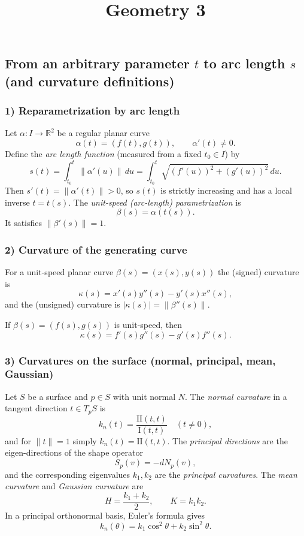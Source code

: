 \documentclass[12pt,a4paper]{article}
\title{Geometry 3}
\author{}
\date{}
\theoremstyle{plain}
\theoremstyle{definition}      %
\begin{document}
	\maketitle

\subsection*{From an arbitrary parameter $t$ to arc length $s$ (and curvature definitions)}

\subsubsection*{1) Reparametrization by arc length}
Let $\alpha:I\to\mathbb R^2$ be a regular planar curve
\[
\alpha(t)=(f(t),g(t)),\qquad \alpha'(t)\neq 0.
\]
Define the \emph{arc length function} (measured from a fixed $t_0\in I$) by
\[
s(t)=\int_{t_0}^{t}\|\alpha'(u)\|\,du
=\int_{t_0}^{t}\sqrt{(f'(u))^2+(g'(u))^2}\,du.
\]
Then $s'(t)=\|\alpha'(t)\|>0$, so $s(t)$ is strictly increasing and has a local inverse $t=t(s)$.
The \emph{unit-speed (arc-length) parametrization} is
\[
\beta(s)=\alpha(t(s)).
\]
It satisfies $\|\beta'(s)\|=1$.

\subsubsection*{2) Curvature of the generating curve}
For a unit-speed planar curve $\beta(s)=(x(s),y(s))$ the (signed) curvature is
\[
\kappa(s)=x'(s)y''(s)-y'(s)x''(s),
\]
and the (unsigned) curvature is $|\kappa(s)|=\|\beta''(s)\|$.

If $\beta(s)=(f(s),g(s))$ is unit-speed, then
\[
\kappa(s)=f'(s)g''(s)-g'(s)f''(s).
\]

\subsubsection*{3) Curvatures on the surface (normal, principal, mean, Gaussian)}
Let $S$ be a surface and $p\in S$ with unit normal $N$.
The \emph{normal curvature} in a tangent direction $t\in T_pS$ is
\[
k_n(t)=\frac{\mathrm{II}(t,t)}{\mathrm{I}(t,t)}\quad (t\neq 0),
\]
and for $\|t\|=1$ simply $k_n(t)=\mathrm{II}(t,t)$.
The \emph{principal directions} are the eigen-directions of the shape operator
\[
S_p(v)=-dN_p(v),
\]
and the corresponding eigenvalues $k_1,k_2$ are the \emph{principal curvatures}.
The \emph{mean curvature} and \emph{Gaussian curvature} are
\[
H=\frac{k_1+k_2}{2},\qquad K=k_1k_2.
\]
In a principal orthonormal basis, Euler's formula gives
\[
k_n(\theta)=k_1\cos^2\theta+k_2\sin^2\theta.
\]
\end{document}
